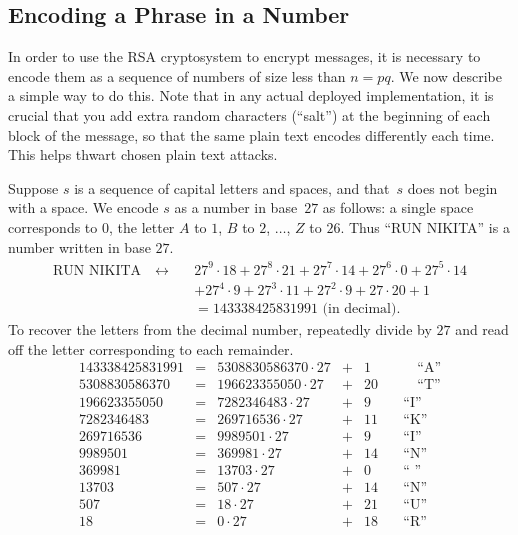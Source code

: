 \subsection{Encoding a Phrase in a Number}\label{sec:encode}
In order to use the RSA cryptosystem to encrypt messages, it is
necessary to encode them as a sequence of numbers of size less than
$n=pq$.  We now describe a simple way to do this.  Note
that in any actual deployed implementation, it is crucial
that you add extra random characters (``salt'') at the beginning
of each block of the message, so that the same plain text encodes
differently each time.  This helps thwart chosen plain text attacks.

Suppose $s$ is a sequence of capital letters and spaces, and that~$s$
does not begin with a space.  We encode $s$ as a number in base~$27$
as follows: a single space corresponds to $0$, the letter $A$ to $1$,
$B$ to $2$, $\ldots$, $Z$ to $26$.  Thus ``RUN NIKITA'' is a number
written in base $27$.
\begin{align*}
\text{RUN NIKITA}\quad\leftrightarrow \quad&
   27^9\cdot 18
+   27^8\cdot 21
+   27^7\cdot 14
+   27^6\cdot 0
+   27^5\cdot 14\\
& +   27^4\cdot 9
+   27^3\cdot 11
+   27^2\cdot 9
+   27\cdot 20
+   1 \\
   &= 143338425831991 \text{ (in decimal)}.
\end{align*}
To recover the letters from the decimal number,
repeatedly divide by $27$ and
read off the letter corresponding to each remainder.
$$
\begin{array}{rcrcrr}
143338425831991 &=& 5308830586370\cdot 27 &+& 1 & \qquad\text{``A''}\\
5308830586370 &=& 196623355050\cdot 27 &+& 20 & \qquad\text{``T''}\\
196623355050 &=& 7282346483 \cdot 27 &+& 9 & \quad\text{``I''}\\
7282346483 &=& 269716536 \cdot 27 &+& 11 & \quad\text{``K''}\\
269716536 &=& 9989501 \cdot 27 &+& 9 & \quad\text{``I''}\\
9989501 &=& 369981 \cdot 27 &+& 14 & \quad\text{``N''}\\
369981 &=& 13703 \cdot 27 &+& 0 & \quad\text{`` ''}\\
13703 &=& 507 \cdot 27 &+& 14 & \quad\text{``N''}\\
507 &=& 18 \cdot 27 &+& 21 & \quad\text{``U''}\\
18 &=& 0 \cdot 27 &+& 18 & \quad\text{``R''}
\end{array}
$$

